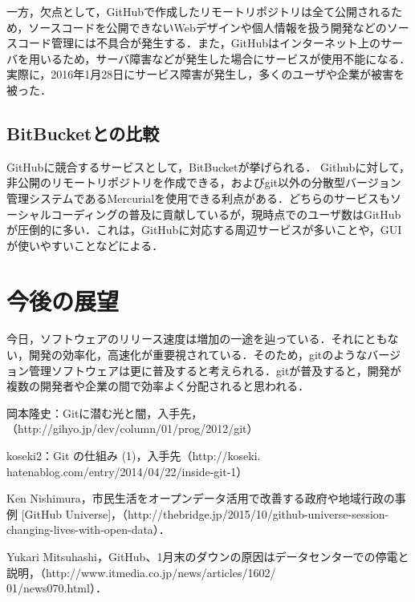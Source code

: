 \documentclass[a4j,9pt,twocolumn]{jsarticle}
\begin{document}
一方，欠点として，GitHubで作成したリモートリポジトリは全て公開されるため，ソースコードを公開できないWebデザインや個人情報を扱う開発などのソースコード管理には不具合が発生する．また，GitHubはインターネット上のサーバを用いるため，サーバ障害などが発生した場合にサービスが使用不能になる．実際に，2016年1月28日にサービス障害が発生し，多くのユーザや企業が被害を被った\cite{news}．

\subsection{BitBucketとの比較}
GitHubに競合するサービスとして，BitBucketが挙げられる． Githubに対して，非公開のリモートリポジトリを作成できる，およびgit以外の分散型バージョン管理システムであるMercurialを使用できる利点がある．どちらのサービスもソーシャルコーディングの普及に貢献しているが，現時点でのユーザ数はGitHubが圧倒的に多い．これは，GitHubに対応する周辺サービスが多いことや，GUIが使いやすいことなどによる．

\section{今後の展望}
今日，ソフトウェアのリリース速度は増加の一途を辿っている．それにともない，開発の効率化，高速化が重要視されている．そのため，gitのようなバージョン管理ソフトウェアは更に普及すると考えられる．gitが普及すると，開発が複数の開発者や企業の間で効率よく分配されると思われる．

\small
\begin{thebibliography}{99}
岡本隆史：Gitに潜む光と闇，入手先，（http://gihyo.jp/dev/column/01/prog/2012/git）

koseki2：Git の仕組み (1)，入手先（http://koseki.\\hatenablog.com/entry/2014/04/22/inside-git-1）

Ken Nishimura，市民生活をオープンデータ活用で改善する政府や地域行政の事例 [GitHub Universe]，（http://thebridge.jp/2015/10/github-universe-session-changing-lives-with-open-data）．

Yukari Mitsuhashi，GitHub、1月末のダウンの原因はデータセンターでの停電と説明，（http://www.itmedia.co.jp/news/articles/1602/\\01/news070.html）．
\end{thebibliography}
\end{document}
